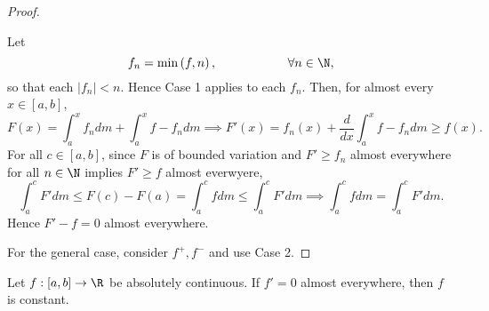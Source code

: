\documentclass[pmath451]{subfiles}
\begin{document}
\begin{proof}
\begin{case}
            Let
            \begin{equation*}
                f_n = \min\left( f,n \right),\hspace{2cm}\forall n\in\N,
            \end{equation*}
            so that each $\left| f_n \right|<n$. Hence Case 1 applies to each $f_n$. Then, for almost every $x\in\left[ a,b \right]$,
            \begin{equation*}
                F\left( x \right) = \int^{x}_{a}f_ndm + \int^{x}_{a}f-f_ndm \implies F'\left( x \right) = f_n\left( x \right) + \frac{d}{dx} \int^{x}_{a}f-f_ndm \geq f\left( x \right).
            \end{equation*}
            For all $c\in\left[ a,b \right]$, since $F$ is of bounded variation and $F'\geq f_n$ almost everywhere for all $n\in\N$ implies $F'\geq f$ almost everwyere,
            \begin{equation*}
                \int^{c}_{a}F'dm \leq F\left( c \right)-F\left( a \right) = \int^{c}_{a}fdm \leq \int^{c}_{a}F'dm \implies \int^{c}_{a}fdm = \int^{c}_{a}F'dm.
            \end{equation*}
            Hence $F'-f=0$ almost everywhere.
        \end{case}

        For the general case, consider $f^+,f^-$ and use Case 2.
    \end{proof}
    
    \begin{lemma}{}
        Let $f:\left[ a,b \right]\to\R$ be absolutely continuous. If $f'=0$ almost everywhere, then $f$ is constant.
    \end{lemma}
\end{document}
